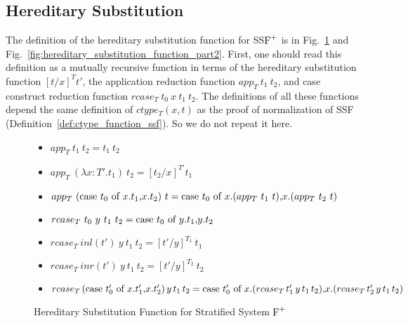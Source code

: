 \subsection{Hereditary Substitution}
\label{sec:the_hereditary_substitution_function_ssfp}

The definition of the hereditary substitution function for SS$\mbox{F}^{+}$ is
in Fig.~\ref{fig:hereditary_substitution_function_part1} and
Fig.~\ref{fig:hereditary_substitution_function_part2}.  First, one
should read this definition as a mutually recursive function in terms
of the hereditary substitution function $[t/x]^T t'$, the
application reduction function $app_T\ t_1\ t_2$, and case
construct reduction function $rcase_T\ t_0\ x\ t_1\ t_2$.  The
definitions of all these functions depend the same definition of
$ctype_T(x, t)$ as the proof of normalization of SSF
(Definition~\ref{def:ctype_function_ssf}).  So we do not repeat it
here.
\begin{figure}
  \small
  \begin{itemize}
  \item[] $app_T\ t_1\ t_2 = t_1\ t_2$
    
  \item[] $app_T\ (\lambda x:T'.t_1)\ t_2 = [t_2/x]^{T'} t_1$
  \item[] $app_T\ (\mbox{case}\ t_0\ \text{of}\ x\text{.}t_1\text{,}x\text{.}t_2)\ t = 
    \mbox{case}\ t_0\ \text{of}\ x\text{.}(app_T\ t_1\ t)\text{,}x\text{.}(app_T\ t_2\ t)$
  \end{itemize}
  
  \begin{itemize}
  \item[] $rcase_{T}\ t_0\ y\ t_1\ t_2 = \mbox{case}\ t_0\ \text{of}\ y\text{.}t_1\text{,}y\text{.}t_2$
  \item[] $rcase_{T}\ inl(t')\ y\ t_1\ t_2 = [t'/y]^{T_1}\ t_1$
  \item[] $rcase_{T}\ inr(t')\ y\ t_1\ t_2 = [t'/y]^{T_2}\ t_2$
  \item[] $rcase_{T}\,(\mbox{case}\ t'_0\ \text{of}\ x\text{.}t'_1\text{,}x\text{.}t'_2)\,y\,t_1\,t_2 = 
    \mbox{case}\ t'_0\ \text{of}\ x\text{.}(rcase_{T}\,t'_1\,y\,t_1\,t_2)\text{,}x\text{.}(rcase_{T}\,t'_2\,y\,t_1\,t_2)$
  \end{itemize}
  \caption{Hereditary Substitution Function for Stratified System $\mbox{F}^{+}$}
  \label{fig:hereditary_substitution_function_part1}
\end{figure}

